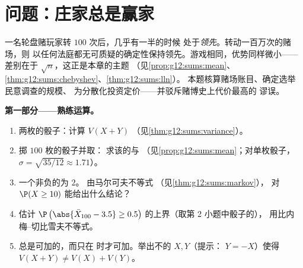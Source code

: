 \section{问题：庄家总是赢家}

\begin{problem}
\label{pb:g12:sums:1}
一名轮盘赌玩家转 $100$ 次后，几乎有一半的时候
处于\emph{领先}。转动一百万次的赌场，则
以任何法庭都无可质疑的确定性保持领先。游戏相同，优势同样微小——
差别在于 $\sqrt n$，这正是本章的主题
（见\cref{prop:g12:sums:mean}、
\cref{thm:g12:sums:chebyshev}、\cref{thm:g12:sums:lln}）。
本题核算赌场账目、确定选举民意调查的规模、
为分散化投资定价——并驳斥赌博史上代价最高的
谬误。

\medskip
\noindent\textbf{第一部分——熟练运算。}
\begin{enumerate}
  \item 两枚的骰子：计算 $V(X + Y)$
        （见\cref{thm:g12:sums:variance}）。
  \item 掷 $100$ 枚的骰子并取：
        求该的与
        （见\cref{prop:g12:sums:mean}；对单枚骰子，
        $\sigma = \sqrt{35/12} \approx 1.71$）。
  \item 一个非负的为 $2$。
        由马尔可夫不等式
        （见\cref{thm:g12:sums:markov}），
        对 $\P(X \geq 10)$ 能给出什么结论？
  \item 估计 $\P\left(\abs{\bar X_{100} - 3.5} \geq
        0.5\right)$ 的上界（取第 2 小题中骰子的），
        用比内梅–切比雪夫不等式。
  \item {}总是可加的，而只在
        时才可加。举出不的 $X, Y$（提示：
        $Y = -X$）使得
        $V(X + Y) \neq V(X) + V(Y)$。
\end{enumerate}


\end{problem}
